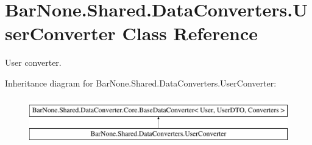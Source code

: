 \hypertarget{class_bar_none_1_1_shared_1_1_data_converters_1_1_user_converter}{}\section{Bar\+None.\+Shared.\+Data\+Converters.\+User\+Converter Class Reference}
\label{class_bar_none_1_1_shared_1_1_data_converters_1_1_user_converter}


User converter.  


Inheritance diagram for Bar\+None.\+Shared.\+Data\+Converters.\+User\+Converter\+:\begin{figure}[H]
\begin{center}
\leavevmode
\includegraphics[height=2.000000cm]{class_bar_none_1_1_shared_1_1_data_converters_1_1_user_converter}
\end{center}
\end{figure}

